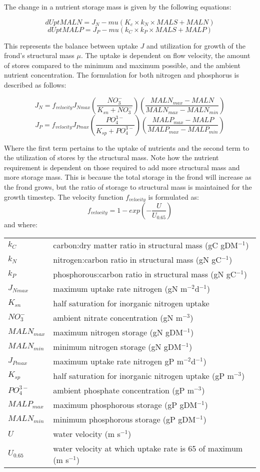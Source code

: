 \documentclass{deltares_manual}
\begin{document}
The change in a nutrient storage mass is given by the following equations:

\[dUptMALN = J_N - mu(K_c \times k_N \times MALS + MALN)\]
\[dUptMALP = J_P - mu(k_C \times k_P \times MALS + MALP)\]

This represents the balance between uptake $J$ and utilization for growth of the frond's structural mass $\mu$. The uptake is dependent on flow velocity, the amount of stores compared to the minimum and maximum possible, and the ambient nutrient concentration. The formulation for both nitrogen and phosphorus is described as follows:

\[J_N = f_{velocity}J_{Nmax}(\frac{NO_3^-}{K_{sn}+NO_3^-})(\frac{MALN_{max}-MALN}{MALN_{max}-MALN_{min}})\]
\[J_P = f_{velocity}J_{Pmax}(\frac{PO_4^{3-}}{K_{sp}+PO_4^{3-}})(\frac{MALP_{max}-MALP}{MALP_{max}-MALP_{min}})\]

Where the first term pertains to the uptake of nutrients and the second term to the utilization of stores by the structural mass. Note how the nutrient requirement is dependent on those required to add more structural mass and more storage mass. This is because the total storage in the frond will increase as the frond grows, but the ratio of storage to structural mass is maintained for the growth timestep. The velocity function $f_{velocity}$ is formulated as:
\[f_{velocity} = 1-exp(-\frac{U}{U_{0.65}})\]
and where:\\
\begin{tabular}{ll}
$k_C$        & carbon:dry matter ratio in structural mass (gC gDM$^{-1}$)\\
$k_N$        & nitrogen:carbon ratio in structural mass (gN gC$^{-1}$)\\
$k_P$        & phosphorous:carbon ratio in structural mass (gN gC$^{-1}$)\\
$J_{Nmax}$   & maximum uptake rate nitrogen (gN m$^{-2}$d$^{-1}$)\\
$K_{sn}$     & half saturation for inorganic nitrogen uptake\\
$NO_3^-$     & ambient nitrate concentration (gN m$^{-3}$)\\
$MALN_{max}$ & maximum nitrogen storage (gN gDM$^{-1}$)\\
$MALN_{min}$ & minimum nitrogen storage (gN gDM$^{-1}$)\\
$J_{Pmax}$   & maximum uptake rate nitrogen gP m$^{-2}$d$^{-1}$)\\
$K_{sp}$     & half saturation for inorganic nitrogen uptake (gP m$^{-3}$)\\
$PO_4^{3-}$  & ambient phosphate concentration (gP m$^{-3}$)\\
$MALP_{max}$ & maximum phosphorous storage (gP gDM$^{-1}$)\\
$MALN_{min}$ & minimum phosphorous storage (gP gDM$^{-1}$)\\
$U$          & water velocity (m s$^{-1}$)\\
$U_{0.65}$   & water velocity at which uptake rate is 65 of maximum (m s$^{-1}$)\\
\end{tabular}
\end{document}
